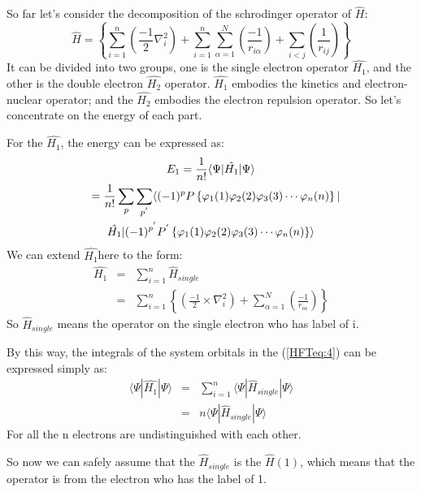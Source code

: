 So far let's consider the decomposition of the schrodinger operator
of $\hat{H}$:
\begin{equation}\label{HFTeq:21}
    \hat{H}= \left\{\sum_{i=1}^{n}(\frac{-1}{2}\nabla_{i}^2)
    +\sum_{i=1}^{n}\sum_{\alpha=1}^{N}(\frac{-1}{r_{i\alpha}})
    +\sum_{i<j}(\frac{1}{r_{ij}})
\right\}
\end{equation}
It can be divided into two groups, one is the single electron
operator $\hat{H_{1}}$, and the other is the double electron
$\hat{H_{2}}$ operator. $\hat{H_{1}}$ embodies the kinetics and
electron-nuclear operator; and the $\hat{H_{2}}$ embodies the
electron repulsion operator. So let's concentrate on the energy of
each part.

For the $\hat{H_{1}}$, the energy can be expressed as:
\begin{multline}\label{HFTeq:4}
E_{1}=\frac{1}{n!}\langle\Psi|\hat{H_{1}}|\Psi\rangle \\
\shoveleft{=\frac{1}{n!}\sum_{p}\sum_{p^{'}} \langle (-1)^{p}P
\left \{ \varphi_{1}(1)\varphi_{2}(2)\varphi_{3}(3)\cdots\varphi_{n}(n)\right \} |}  \\
\hat{H_{1}}|(-1)^{p^{'}}P^{'} \left \{
\varphi_{1}(1)\varphi_{2}(2)\varphi_{3}(3)\cdots\varphi_{n}(n)\right
\} \rangle
\end{multline}
We can extend $\hat{H_{1}}$here to the form:
\begin{eqnarray}
  \hat{H_{1}} &=&  \sum_{i=1}^{n}\hat{H}_{single} \nonumber \\
   &=& \sum_{i=1}^{n}\left\{(\frac{-1}{2}\times\nabla_{i}^2)+
   \sum_{\alpha=1}^{N}(\frac{-1}{r_{i\alpha}})\right\}
\end{eqnarray}
So $\hat{H}_{single}$ means the operator on the single electron who
has label of i.

By this way, the integrals of the system orbitals in the
(\ref{HFTeq:4}) can be expressed simply as:
\begin{eqnarray}\label{HFTeq:3}
 \langle\Psi|\hat{H_{1}}|\Psi\rangle &=& \sum_{i=1}^{n}
\langle\Psi|\hat{H}_{single}|\Psi\rangle \nonumber \\
   &=& n\langle\Psi|\hat{H}_{single}|\Psi\rangle
\end{eqnarray}
For all the n electrons are undistinguished with each other.

So now we can safely assume that the $\hat{H}_{single}$ is the
$\hat{H}(1)$, which means that the operator is from the electron who
has the label of 1.

